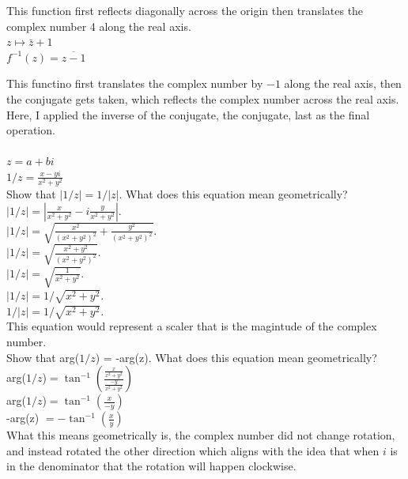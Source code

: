 \documentclass[12pt]{article}
\begin{document}
This function first reflects diagonally across the origin then translates the complex number 4 along the real axis.\\


 $z \mapsto \bar{z} + 1$\\
$f^{-1}(z) = \overline{z - 1}$

This functino first translates the complex number by $-1$ along the real axis, then the conjugate gets taken, which reflects the complex number across the real axis.\\ 


Here, I applied the inverse of the conjugate, the conjugate, last as the final operation.\\ 


\\
$z = a + bi$\\
$1/z = \frac{x-yi}{x^2+y^2}$\\

 Show that $|1/z| = 1/|z|$. What does this equation mean geometrically?\\
$|1/z| = |\frac{x}{x^2+y^2} - i\frac{y}{x^2 + y^2}|$.\\
$|1/z| = \sqrt{\frac{x^2}{(x^2 + y^2)^2} + \frac{y^2}{(x^2+y^2)^2}}$.\\
$|1/z| = \sqrt{\frac{x^2+y^2}{(x^2+y^2)^2}}$.\\
$|1/z| = \sqrt{\frac{1}{x^2+y^2}}$.\\
$|1/z| = 1/\sqrt{x^2+y^2}$.\\

$1/|z| = 1/\sqrt{x^2 + y^2}$.\\

This equation would represent a scaler that is the magintude of the complex number.\\

 Show that arg($1/z$) = -arg(z). What does this equation mean geometrically?\\

arg($1/z$)$ = \tan^{-1}(\frac{\frac{x}{x^2+y^2}}{\frac{-y}{x^2+y^2}})$\\
arg($1/z$)$ = \tan^{-1}(\frac{x}{-y})$\\
-arg(z) $ = -\tan^{-1}(\frac{x}{y})$\\

What this means geometrically is, the complex number did not change rotation, and instead rotated the other direction which aligns with the idea that when $i$ is in the denominator that the rotation will happen clockwise.\\
\end{document}
